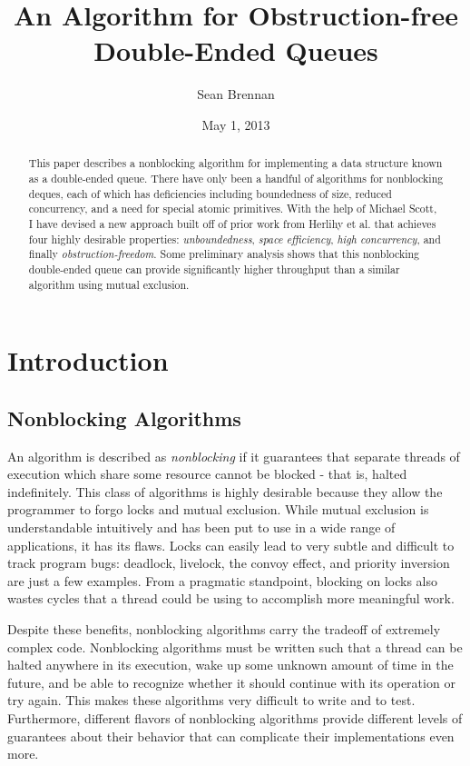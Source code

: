 \documentclass[11pt, letterpaper]{article}
\title{An Algorithm for Obstruction-free Double-Ended Queues}
\author{Sean Brennan}
\date{May 1, 2013}
\begin{document}
    \maketitle

    \begin{abstract}
        This paper describes a nonblocking algorithm for implementing a data structure known as a double-ended queue. There have only been a handful of algorithms for nonblocking deques, each of which has deficiencies including boundedness of size, reduced concurrency, and a need for special atomic primitives. With the help of Michael Scott, I have devised a new approach built off of prior work from Herlihy et al. that achieves four highly desirable properties: \emph{unboundedness}, \emph{space efficiency}, \emph{high concurrency}, and finally \emph{obstruction-freedom}. Some preliminary analysis shows that this nonblocking double-ended queue can provide significantly higher throughput than a similar algorithm using mutual exclusion.
    \end{abstract}

    \section{Introduction}
        \subsection{Nonblocking Algorithms}
            An algorithm is described as \emph{nonblocking} if it guarantees that separate threads of execution which share some resource cannot be blocked - that is, halted indefinitely. This class of algorithms is highly desirable because they allow the programmer to forgo locks and mutual exclusion. While mutual exclusion is understandable intuitively and has been put to use in a wide range of applications, it has its flaws. Locks can easily lead to very subtle and difficult to track program bugs: deadlock, livelock, the convoy effect, and priority inversion are just a few examples. From a pragmatic standpoint, blocking on locks also wastes cycles that a thread could be using to accomplish more meaningful work.

            Despite these benefits, nonblocking algorithms carry the tradeoff of extremely complex code. Nonblocking algorithms must be written such that a thread can be halted anywhere in its execution, wake up some unknown amount of time in the future, and be able to recognize whether it should continue with its operation or try again. This makes these algorithms very difficult to write and to test. Furthermore, different flavors of nonblocking algorithms provide different levels of guarantees about their behavior that can complicate their implementations even more.
\end{document}
